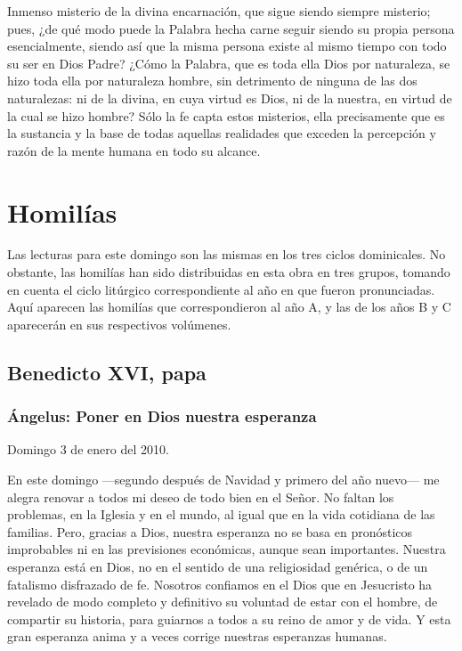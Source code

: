 Inmenso misterio de la divina encarnación, que sigue siendo siempre misterio; pues, ¿de qué modo puede la Palabra hecha carne seguir siendo su propia persona esencialmente, siendo así que la misma persona existe al mismo tiempo con todo su ser en Dios Padre? ¿Cómo la Palabra, que es toda ella Dios por naturaleza, se hizo toda ella por naturaleza hombre, sin detrimento de ninguna de las dos naturalezas: ni de la divina, en cuya virtud es Dios, ni de la nuestra, en virtud de la cual se hizo hombre? Sólo la fe capta estos misterios, ella precisamente que es la sustancia y la base de todas aquellas realidades que exceden la percepción y razón de la mente humana en todo su alcance.


\section{Homilías}

Las lecturas para este domingo son las mismas en los tres ciclos dominicales. No obstante, las homilías han sido distribuidas en esta obra en tres grupos, tomando en cuenta el ciclo litúrgico correspondiente al año en que fueron pronunciadas. Aquí aparecen las homilías que correspondieron al año A, y las de los años B y C aparecerán en sus respectivos volúmenes.

\subsection{Benedicto XVI, papa}

\subsubsection{Ángelus: Poner en Dios nuestra esperanza}

Domingo 3 de enero del 2010.

En este domingo ---segundo después de Navidad y primero del año nuevo--- me alegra renovar a todos mi deseo de todo bien en el Señor. No faltan los problemas, en la Iglesia y en el mundo, al igual que en la vida cotidiana de las familias. Pero, gracias a Dios, nuestra esperanza no se basa en pronósticos improbables ni en las previsiones económicas, aunque sean importantes. Nuestra esperanza está en Dios, no en el sentido de una religiosidad genérica, o de un fatalismo disfrazado de fe. Nosotros confiamos en el Dios que en Jesucristo ha revelado de modo completo y definitivo su voluntad de estar con el hombre, de compartir su historia, para guiarnos a todos a su reino de amor y de vida. Y esta gran esperanza anima y a veces corrige nuestras esperanzas humanas.

